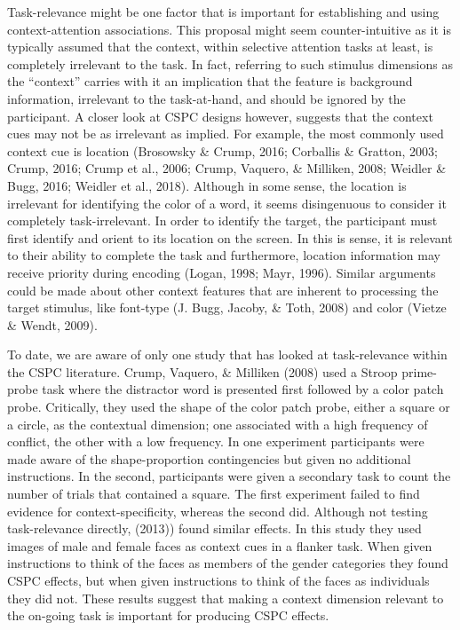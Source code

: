 \documentclass[english,,man,floatsintext]{apa6}
\begin{document}
Task-relevance might be one factor that is important for establishing
and using context-attention associations. This proposal might seem
counter-intuitive as it is typically assumed that the context, within
selective attention tasks at least, is completely irrelevant to the
task. In fact, referring to such stimulus dimensions as the
\enquote{context} carries with it an implication that the feature is
background information, irrelevant to the task-at-hand, and should be
ignored by the participant. A closer look at CSPC designs however,
suggests that the context cues may not be as irrelevant as implied. For
example, the most commonly used context cue is location (Brosowsky \&
Crump, 2016; Corballis \& Gratton, 2003; Crump, 2016; Crump et al.,
2006; Crump, Vaquero, \& Milliken, 2008; Weidler \& Bugg, 2016; Weidler
et al., 2018). Although in some sense, the location is irrelevant for
identifying the color of a word, it seems disingenuous to consider it
completely task-irrelevant. In order to identify the target, the
participant must first identify and orient to its location on the
screen. In this is sense, it is relevant to their ability to complete
the task and furthermore, location information may receive priority
during encoding (Logan, 1998; Mayr, 1996). Similar arguments could be
made about other context features that are inherent to processing the
target stimulus, like font-type (J. Bugg, Jacoby, \& Toth, 2008) and
color (Vietze \& Wendt, 2009).

To date, we are aware of only one study that has looked at
task-relevance within the CSPC literature. Crump, Vaquero, \& Milliken
(2008) used a Stroop prime-probe task where the distractor word is
presented first followed by a color patch probe. Critically, they used
the shape of the color patch probe, either a square or a circle, as the
contextual dimension; one associated with a high frequency of conflict,
the other with a low frequency. In one experiment participants were made
aware of the shape-proportion contingencies but given no additional
instructions. In the second, participants were given a secondary task to
count the number of trials that contained a square. The first experiment
failed to find evidence for context-specificity, whereas the second did.
Although not testing task-relevance directly, (2013)) found similar
effects. In this study they used images of male and female faces as
context cues in a flanker task. When given instructions to think of the
faces as members of the gender categories they found CSPC effects, but
when given instructions to think of the faces as individuals they did
not. These results suggest that making a context dimension relevant to
the on-going task is important for producing CSPC effects.
\end{document}
